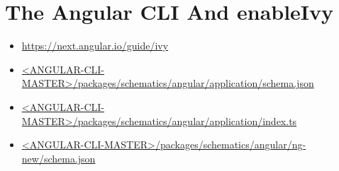 \section{The Angular CLI And enableIvy}


\begin{itemize}
  \item \url{https://next.angular.io/guide/ivy}
\end{itemize}


\begin{itemize}
  \item \href{https://github.com/angular/angular-cli/blob/master/packages/schematics/angular/application/schema.json}
        {<ANGULAR-CLI-MASTER>/packages/schematics/angular/application/schema.json}
\end{itemize}





\begin{itemize}
  \item \href{https://github.com/angular/angular-cli/blob/master/packages/schematics/angular/application/index.ts}
        {<ANGULAR-CLI-MASTER>/packages/schematics/angular/application/index.ts}
\end{itemize}





\begin{itemize}
  \item \href{https://github.com/angular/angular-cli/blob/master/packages/schematics/angular/ng-new/schema.json}
        {<ANGULAR-CLI-MASTER>/packages/schematics/angular/ng-new/schema.json}
\end{itemize}


